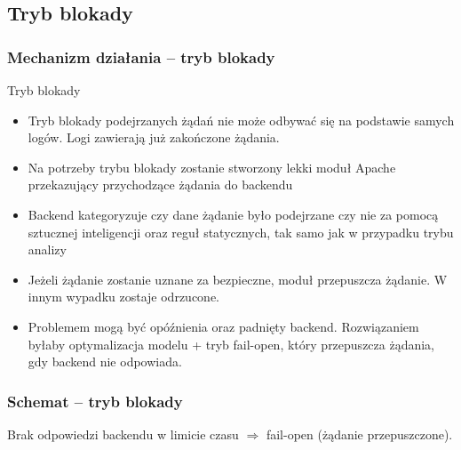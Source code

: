 \documentclass[10pt,xcolor=table]{beamer}
\begin{document}
\subsection{Tryb blokady}
\begin{frame}
    \frametitle{Mechanizm działania -- tryb blokady}
    \begin{block}{Tryb blokady}
    \begin{itemize}
        \item Tryb blokady podejrzanych żądań nie może odbywać się na podstawie samych logów. Logi zawierają już zakończone żądania.
        \item Na potrzeby trybu blokady zostanie stworzony lekki moduł Apache przekazujący przychodzące żądania do backendu
        \item Backend kategoryzuje czy dane żądanie było podejrzane czy nie za pomocą sztucznej inteligencji oraz reguł statycznych, tak samo jak w przypadku trybu analizy
        \item Jeżeli żądanie zostanie uznane za bezpieczne, moduł przepuszcza żądanie. W innym wypadku zostaje odrzucone.
        \item Problemem mogą być opóźnienia oraz padnięty backend. Rozwiązaniem byłaby optymalizacja modelu + tryb fail-open, który przepuszcza żądania, gdy backend nie odpowiada.
    \end{itemize}
    \end{block}  
\end{frame}
\begin{frame}
  \frametitle{Schemat -- tryb blokady}
  \centering

  \vspace{2ex}
  {\scriptsize Brak odpowiedzi backendu w limicie czasu $\Rightarrow$ fail-open (żądanie przepuszczone).}
\end{frame}
\end{document}
